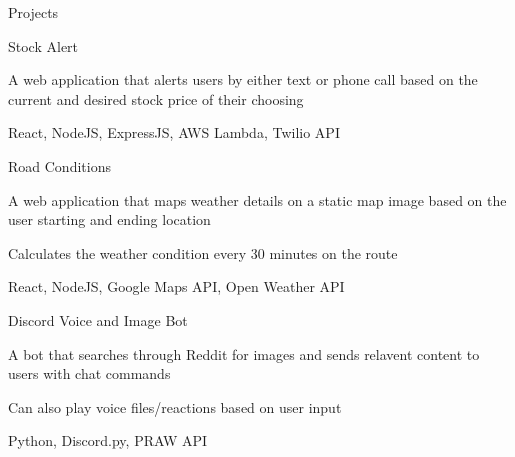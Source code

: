 \documentclass{resume} %
\begin{document}
\begin{rSection}{Projects}

    \begin{rSubsection}{Stock Alert}{}{}{}
        \item A web application that alerts users by either text or phone call based on the current and desired stock price of their choosing
        \item React, NodeJS, ExpressJS, AWS Lambda, Twilio API
    \end{rSubsection}


    \begin{rSubsection}{Road Conditions}{}{}{}

        \item A web application that maps weather details on a static map image based on the user starting and ending location
        \item Calculates the weather condition every 30 minutes on the route
        \item React, NodeJS, Google Maps API, Open Weather API
    \end{rSubsection}


    \begin{rSubsection}{Discord Voice and Image Bot}{}{}{}

        \item A bot that searches through Reddit for images and sends relavent content to users with chat commands
        \item Can also play voice files/reactions based on user input
        \item Python, Discord.py, PRAW API
    \end{rSubsection}

\end{rSection}


\end{document}

